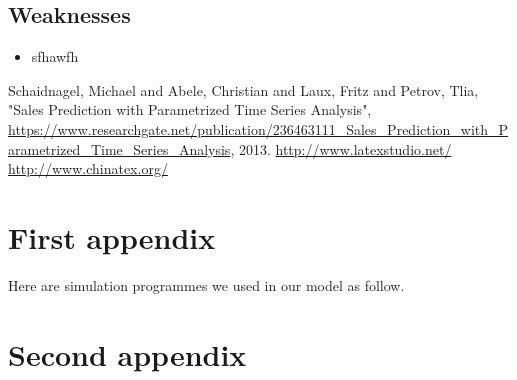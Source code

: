 \documentclass{mcmthesis}
\begin{document}
\subsection{Weaknesses}
\begin{itemize}
\item




sfhawfh
\end{itemize}

\begin{thebibliography}{99}
	 Schaidnagel, Michael and Abele, Christian and Laux, Fritz and Petrov, Tlia,  "Sales Prediction with Parametrized Time Series Analysis", \url{https://www.researchgate.net/publication/236463111_Sales_Prediction_with_Parametrized_Time_Series_Analysis}, 2013.
	\url{http://www.latexstudio.net/}
	\url{http://www.chinatex.org/}
\end{thebibliography}


\begin{appendices}

\section{First appendix}

\lipsum[13]

Here are simulation programmes we used in our model as follow.\\

%

\section{Second appendix}

%


\end{appendices}
\end{document}
